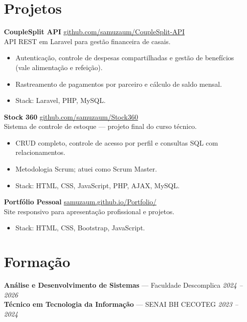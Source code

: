 \documentclass[11pt,a4paper]{article}
\begin{document}
\section{Projetos}

\textbf{CoupleSplit API} \hfill
\href{https://github.com/samuzaum/CoupleSplit-API}{github.com/samuzaum/CoupleSplit-API}\\
API REST em Laravel para gestão financeira de casais.
\begin{itemize}
  \item Autenticação, controle de despesas compartilhadas e gestão de benefícios (vale
        alimentação e refeição).
  \item Rastreamento de pagamentos por parceiro e cálculo de saldo mensal.
  \item Stack: Laravel, PHP, MySQL.
\end{itemize}

\medskip

\textbf{Stock 360} \hfill
\href{https://github.com/samuzaum/Stock360}{github.com/samuzaum/Stock360}\\
Sistema de controle de estoque --- projeto final do curso técnico.
\begin{itemize}
  \item CRUD completo, controle de acesso por perfil e consultas SQL com relacionamentos.
  \item Metodologia Scrum; atuei como Scrum Master.
  \item Stack: HTML, CSS, JavaScript, PHP, AJAX, MySQL.
\end{itemize}

\medskip

\textbf{Portfólio Pessoal} \hfill
\href{https://samuzaum.github.io/Portfolio/}{samuzaum.github.io/Portfolio/}\\
Site responsivo para apresentação profissional e projetos.
\begin{itemize}
  \item Stack: HTML, CSS, Bootstrap, JavaScript.
\end{itemize}

\section{Formação}

\textbf{Análise e Desenvolvimento de Sistemas} --- Faculdade Descomplica \hfill \textit{2024 -- 2026}\\
\textbf{Técnico em Tecnologia da Informação} --- SENAI BH CECOTEG \hfill \textit{2023 -- 2024}
\end{document}
